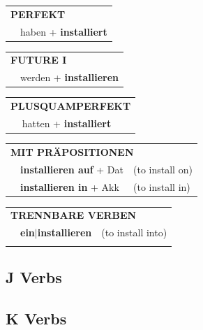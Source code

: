 \documentclass[10pt,a4paper]{revtex4-2}
\begin{document}
\begin{verbbox}
 \begin{tabular}{rl}
     \multicolumn{2}{l}{\textbf{PERFEKT}}\\
   & haben + \textbf{installiert}\\
  \end{tabular}
\hfill
\begin{tabular}{rl}
    \multicolumn{2}{l}{\textbf{FUTURE I}}\\
   & werden + \textbf{installieren}\\
  \end{tabular}
\hfill
\begin{tabular}{rl}
    \multicolumn{2}{l}{\textbf{PLUSQUAMPERFEKT}}\\
   & hatten + \textbf{installiert}\\
  \end{tabular}

 \vspace{10pt}

\begin{tabular}{lll}
      \multicolumn{3}{l}{\textbf{MIT PRÄPOSITIONEN}}\\
& \textbf{installieren auf} + Dat & (to install on)\\
& \textbf{installieren in} + Akk & (to install in)\\
\end{tabular}
  \hfill
\begin{tabular}{lll}
      \multicolumn{3}{l}{\textbf{TRENNBARE VERBEN}}\\
 & \textbf{ein$|$installieren} & (to install into)\\
\vspace{10pt}
  \end{tabular}

\vspace{-5pt}
\end{verbbox}

\subsection{J Verbs}

\subsection{K Verbs}
\end{document}
